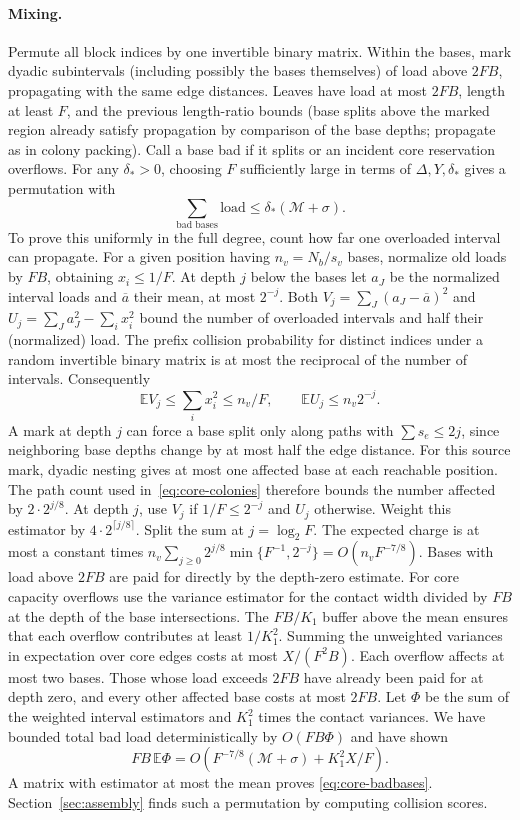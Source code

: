 \paragraph{Mixing.}
Permute all block indices by one invertible binary matrix. Within the bases, mark dyadic subintervals (including possibly the bases themselves) of load above \(2FB\), propagating with the same edge distances. Leaves have load at most \(2FB\), length at least \(F\), and the previous length-ratio bounds (base splits above the marked region already satisfy propagation by comparison of the base depths; propagate as in colony packing). Call a base bad if it splits or an incident core reservation overflows. For any \(\delta_*>0\), choosing \(F\) sufficiently large in terms of \(\Delta,Y,\delta_*\) gives a permutation with
\begin{equation}
 \sum_{\text{bad bases}}\mathrm{load}\le\delta_*(\mathcal M+\sigma).
 \label{eq:core-badbases}
\end{equation}
To prove this uniformly in the full degree, count how far one overloaded interval can propagate. For a given position having \(n_v=N_b/s_v\) bases, normalize old loads by \(FB\), obtaining \(x_i\le1/F\). At depth \(j\) below the bases let \(a_J\) be the normalized interval loads and \(\overline a\) their mean, at most \(2^{-j}\). Both \(V_j=\sum_J(a_J-\overline a)^2\) and \(U_j=\sum_J a_J^2-\sum_i x_i^2\) bound the number of overloaded intervals and half their (normalized) load. The prefix collision probability for distinct indices under a random invertible binary matrix is at most the reciprocal of the number of intervals. Consequently
\[
 \mathbb E V_j\le\sum_i x_i^2\le n_v/F,\qquad
 \mathbb E U_j\le n_v2^{-j}.
\]
A mark at depth \(j\) can force a base split only along paths with \(\sum s_e\le 2j\), since neighboring base depths change by at most half the edge distance. For this source mark, dyadic nesting gives at most one affected base at each reachable position. The path count used in~\eqref{eq:core-colonies} therefore bounds the number affected by \(2\cdot 2^{j/8}\). At depth \(j\), use \(V_j\) if \(1/F\le2^{-j}\) and \(U_j\) otherwise. Weight this estimator by \(4\cdot 2^{\lceil j/8\rceil}\). Split the sum at \(j=\log_2 F\). The expected charge is at most a constant times \(n_v\sum_{j\ge0}2^{j/8}\min\{F^{-1},2^{-j}\}=O(n_vF^{-7/8})\). Bases with load above \(2FB\) are paid for directly by the depth-zero estimate. For core capacity overflows use the variance estimator for the contact width divided by \(FB\) at the depth of the base intersections. The \(FB/K_1\) buffer above the mean ensures that each overflow contributes at least \(1/K_1^2\). Summing the unweighted variances in expectation over core edges costs at most \(X/(F^2B)\). Each overflow affects at most two bases. Those whose load exceeds \(2FB\) have already been paid for at depth zero, and every other affected base costs at most \(2FB\). Let \(\Phi\) be the sum of the weighted interval estimators and \(K_1^2\) times the contact variances. We have bounded total bad load deterministically by $O(FB\Phi)$ and have shown
\[
 FB\,\mathbb E\Phi = O(F^{-7/8}(\mathcal M+\sigma)+ K_1^2X/F).
\]
A matrix with estimator at most the mean proves \eqref{eq:core-badbases}. Section~\ref{sec:assembly} finds such a permutation by computing collision scores.

